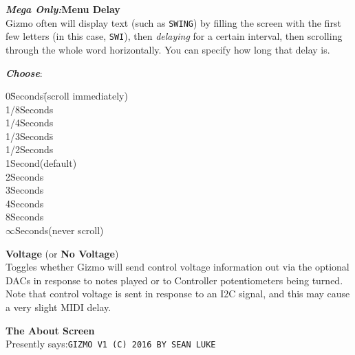\documentclass{article}
\begin{document}
\begin{description}
		
	\item{\bf \textit{Mega Only:}\quad Menu Delay}\\
		Gizmo often will display text (such as \texttt{SWING}) by filling the screen with the first few letters (in this case, \texttt{SWI}), then {\it delaying} for a certain interval, then scrolling through the whole word horizontally. You can specify how long that delay is.
		\begin{description}
			\item{\bf \textit{Choose}}:
			\begin{tabbing}
			0\hspace{2em}\=Seconds\hspace{1in}\=(scroll immediately)\\
			1/8\>Seconds\\
			1/4\>Seconds\\
			1/3\>Seconds\>\hspace{1.5in}\=\\
			1/2\>Seconds\\
			1\>Second\>(default)\\
			2\>Seconds\\
			3\>Seconds\\
			4\>Seconds\\
			8\>Seconds\\
			\(\infty\)\>Seconds\>(never scroll)\>\\
			\end{tabbing}
		\end{description}


	\item{\bf \quad Voltage} (or {\bf No Voltage})\\
		Toggles whether Gizmo will send control voltage information out via the optional DACs in response to notes played or to Controller potentiometers being turned.  Note that control voltage is sent in response to an I2C signal, and this may cause a very slight MIDI delay.
		
	\item{\bf The About Screen}\\
		Presently says:\quad \texttt{GIZMO V1 (C) 2016 BY SEAN LUKE}
	\end{description}
\end{document}
